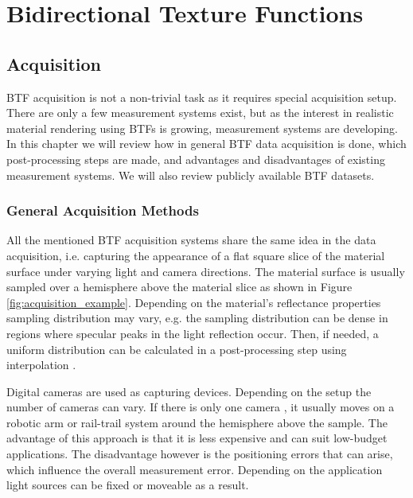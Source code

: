\chapter{Bidirectional Texture Functions}
\label{chapter:stateOfArt}


\section{Acquisition}
\label{chapter:acquisition}

BTF acquisition is not a non-trivial task as it requires special acquisition setup. 
There are only a few measurement systems \cite{star2004,schwartz,dana,Kaleidoscope,Koudelka,statistical_acq} exist, but as the interest in realistic material rendering using BTFs is growing, measurement systems are developing.
In this chapter we will review how in general BTF data acquisition is done, which post-processing steps are made, and advantages and disadvantages of existing measurement systems. 
We will also review publicly available BTF datasets.

\subsection{General Acquisition Methods}
\label{section:General_acquisition}	
All the mentioned BTF acquisition systems share the same idea in the data acquisition, i.e. capturing the appearance of a flat square slice of the material surface under varying light and camera directions.
The material surface is usually sampled over a hemisphere above the material slice as shown in Figure \ref{fig:acquisition_example}.
Depending on the material's reflectance properties sampling distribution may vary, e.g. the sampling distribution can be dense in regions where specular peaks in the light reflection occur. 
Then, if needed, a uniform distribution can be calculated in a post-processing step using interpolation \cite{haindl_visual}.

Digital cameras are used as capturing devices. Depending on the setup the number of cameras can vary.
 If there is only one camera \cite{star2004,statistical_acq,dana}, it usually moves on a robotic arm or rail-trail system around the hemisphere above the sample\cite{star2004}. 
 The advantage of this approach is that it is less expensive and can suit low-budget applications.
The disadvantage however is the positioning errors that can arise, which influence the overall measurement error. 
Depending on the application light sources can be fixed or moveable as a result.

